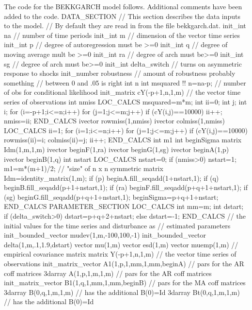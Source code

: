 The code for the BEKKGARCH model follows. Additional
comments have been added to the code.
\beginexample
DATA_SECTION
  // This section describes the data inputs to the model.
  // By default they are read in from the file bekkgarch.dat.
  init_int na  // number of time periods
  init_int m   // dimension of the vector time series
  init_int p   // degree of autoregression must be >=0
  init_int q   // degree of moving average mult be >=0
  init_int ra   // degree of arch must be>=0
  init_int sg   // degree of arch must be>=0
  init_int delta_switch // turns on asymmetric response to shocks
  init_number robustness  // amount of robustness probably something 
              // between 0 and .05 is right
  int n
  int msquared 
 !!  n=na-p;  // number of obs for conditional likelihood
  init_matrix cY(-p+1,n,1,m)  // the vector time series of observations
  int nmiss
 LOC_CALCS 
  msquared=m*m;
  int ii=0;
  int j;
  int i;
  for (i=-p+1;i<=n;i++)
    for (j=1;j<=m;j++)
      if (cY(i,j)==10000) ii++;
  nmiss=ii;
 END_CALCS 
  ivector rowmiss(1,nmiss)
  ivector colmiss(1,nmiss)
 LOC_CALCS 
  ii=1;
  for (i=1;i<=n;i++)
    for (j=1;j<=m;j++)
      if (cY(i,j)==10000) {
        rowmiss(ii)=i;
        colmiss(ii)=j;
        ii++;
      }
 END_CALCS 
  int m1
  int beginSigma
  matrix Idm(1,m,1,m)
  ivector beginF(1,ra)
  ivector beginG(1,sg)
  ivector beginA(1,p)
  ivector beginB(1,q)
  int nstart
 LOC_CALCS
  nstart=0;
  if (nmiss>0) nstart=1;
  m1=m*(m+1)/2;  // "size" of n x n symmetric matrix
  Idm=identity_matrix(1,m); 
  if (p) beginA.fill_seqadd(1+nstart,1);
  if (q) beginB.fill_seqadd(p+1+nstart,1);
  if (ra) beginF.fill_seqadd(p+q+1+nstart,1);
  if (sg) beginG.fill_seqadd(p+q+1+nstart,1);
  beginSigma=p+q+1+nstart;
 END_CALCS 
PARAMETER_SECTION
 LOC_CALCS
  int mm=m;
  int dstart;
  if (delta_switch>0)
    dstart=p+q+2+nstart;
  else
    dstart=-1;
 END_CALCS
  // the initial values for the time series and disturbance as
  // estimated parameters
  init_bounded_vector mudev(1,m,-100,100,-1)
  init_bounded_vector delta(1,m,.1,1.9,dstart)
  vector mu(1,m)
  vector esd(1,m)
  vector muemp(1,m)  // empirical covariance matrix
  matrix Y(-p+1,n,1,m)  // the vector time series of observations
  init_matrix_vector A1(1,p,1,mm,1,mm,beginA)  // pars for the AR coff matrices
  3darray A(1,p,1,m,1,m)  // pars for the AR coff matrices
  init_matrix_vector B1(1,q,1,mm,1,mm,beginB) // pars for the MA coff matrices
  3darray B(0,q,1,m,1,m)  // has the additional B(0)=Id
  3darray Bt(0,q,1,m,1,m)  // has the additional B(0)=Id

